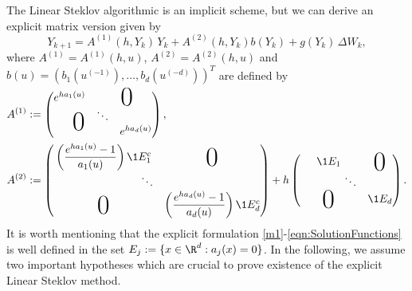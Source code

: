 \documentclass[sort&compress, preprint]{elsarticle}
\theoremstyle{definition}
\theoremstyle{plain}%
\theoremstyle{remark}
\begin{document}
The Linear Steklov algorithmic is an implicit scheme, but 
we can derive an explicit matrix version given by  
\begin{equation}\label{m1}
 Y_{k+1} = A^{(1)}(h,Y_k) \,Y_k + A^{(2)}(h,Y_k)b(Y_k)+ g(Y_k)\, \Delta W_k, 
\end{equation}
where  $A^{(1)}= A^{(1)}(h,u)$,  $A^{(2)}=A^{(2)}(h,u)$  and $b(u)=\left(
		b_1(u^{(-1)}), \dots , b_d(u^{(-d)})
	\right)^T$   are defined  by
\begin{align}\label{eqn:SolutionFunctions}	
	A^{(1)}&:=
		\begin{pmatrix}
			e^{ha_1(u)} & \multicolumn{2}{c}{\text{\kern0.5em\smash{\raisebox{-1ex}{\Huge 0}}}} \\
			&\ddots\\
			\multicolumn{2}{c}{\text{\kern-0.5em\smash{\raisebox{0.95ex}{\Huge 0}}}} 
			& e^{ha_d(u)}
		\end{pmatrix},
		\notag
		\\
	A^{(2)}&:=
	\begin{pmatrix}
		\left(
			\displaystyle
			\frac{e^{ha_1(u)} - 1}{a_1(u)}
		\right)\1{E_1^c}%
		&\BigZero\\
		\qquad \qquad \qquad \qquad\ddots&\\
		\BigZero&
		\left(
			\displaystyle
			\frac{e^{ha_d(u)} - 1}{a_d(u)}
		\right)\1{E_d^c}%
	\end{pmatrix}
	+h
	\begin{pmatrix}
		\1{E_1} & \BigZero\\
		\qquad \qquad \ddots\\
		\BigZero & 
		\1{E_d}
	\end{pmatrix}.	
\end{align}
It is worth mentioning that the explicit formulation \eqref{m1}-\eqref{eqn:SolutionFunctions} 
is well defined in the set $E_j:=\{x \in \R^d: a_j(x)=0\}$. In the following, we 
assume two important hypotheses which are crucial to prove existence 
of the explicit Linear Steklov method.
\end{document}

